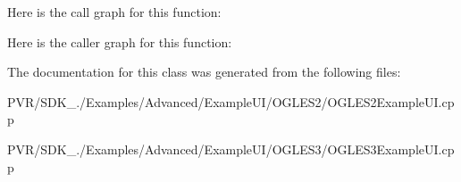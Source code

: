 Here is the call graph for this function\+:




Here is the caller graph for this function\+:




The documentation for this class was generated from the following files\+:\begin{DoxyCompactItemize}
\item 
P\+V\+R/\+S\+D\+K\+\_./\+Examples/\+Advanced/\+Example\+U\+I/\+O\+G\+L\+E\+S2/O\+G\+L\+E\+S2\+Example\+U\+I.\+cpp\item 
P\+V\+R/\+S\+D\+K\+\_./\+Examples/\+Advanced/\+Example\+U\+I/\+O\+G\+L\+E\+S3/O\+G\+L\+E\+S3\+Example\+U\+I.\+cpp\end{DoxyCompactItemize}
